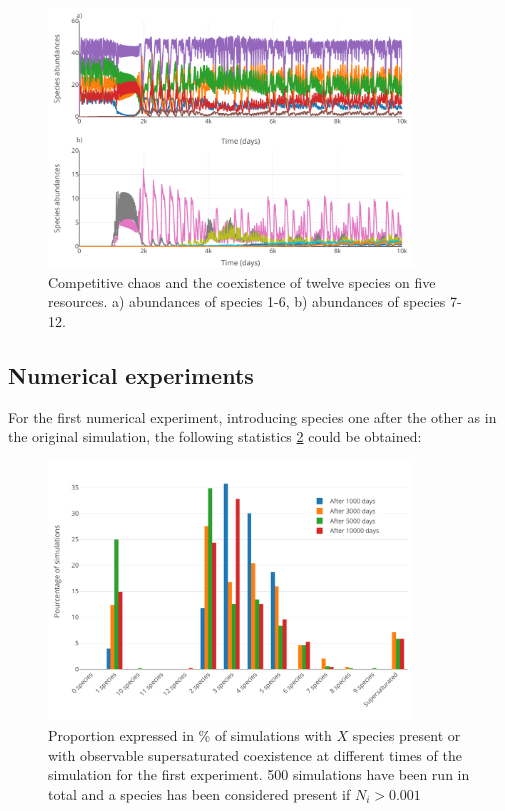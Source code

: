 \begin{figure}[H]
	\begin{center} 
		\includegraphics[width=0.86\textwidth]{../Code/Figures/Figure_4.pdf}
 		\caption{Competitive chaos and the coexistence of twelve species on five resources. a) abundances of species 1-6, b) abundances of species 7-12. }
 		\label{figures:Fig4}
	\end{center}
\end{figure}

\subsection{Numerical experiments}

For the first numerical experiment, introducing species one after the other as in the original simulation, the following statistics \ref{figures:Figexp1bar} could be obtained:\\

\begin{figure}[H]
	\begin{center} 
		\includegraphics[width=0.86\textwidth]{../Code/Figures/Figure_exp1_bar.pdf}
 		\caption{Proportion expressed in \% of simulations with $X$ species present or with observable supersaturated coexistence at different times of the simulation for the first experiment. 500 simulations have been run in total and a species has been considered present if $N_i > 0.001$}
 		\label{figures:Figexp1bar}
	\end{center}
\end{figure}

